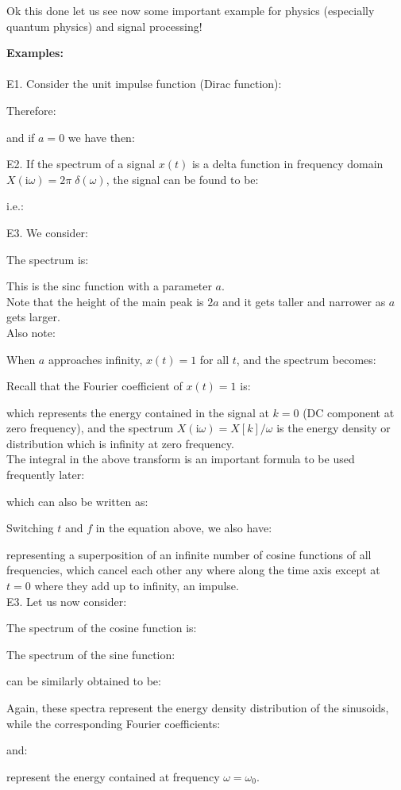 	Ok this done let us see now some important example for physics (especially quantum physics) and signal processing!
	\begin{tcolorbox}[colframe=black,colback=white,sharp corners,breakable]
	\textbf{{\Large {}}Examples:}\\\\
	E1. Consider the unit impulse function (Dirac function):
	
	Therefore:
	
	and if $a=0$ we have then:
	
	E2. If the spectrum of a signal $x(t)$ is a delta function in frequency domain $X(\mathrm{i}\omega)=2\pi\;\delta(\omega)$, the signal can be found to be:
	
	i.e.:
	
	E3. We consider:
	
	The spectrum is:
	
	This is the sinc function with a parameter $a$.\\
	
	Note that the height of the main peak is $2a$ and it gets taller and narrower as	$a$ gets larger.\\
	
	 Also note:
	
	When $a$ approaches infinity, $x(t)=1$ for all $t$, and the spectrum becomes:
	
	Recall that the Fourier coefficient of $x(t)=1$ is:
	
	which represents the energy contained in the signal at $k=0$ (DC component at zero frequency), and the spectrum $X(\mathrm{i}\omega)=X[k]/\omega$ is the energy density or distribution which is infinity at zero frequency.\\
	
	The integral in the above transform is an important formula to be used frequently later:
	
	which can also be written as:
	
	Switching $t$ and $f$ in the equation above, we also have:
	
	representing a superposition of an infinite number of cosine functions of all
	frequencies, which cancel each other any where along the time axis except at
	$t=0$ where they add up to infinity, an impulse. \\
	
	E3. Let us now consider:
	
	The spectrum of the cosine function is:
	
	The spectrum of the sine function:
	
	can be similarly obtained to be:
	
	Again, these spectra represent the energy density distribution of the sinusoids, while the corresponding Fourier coefficients:
	
	and:
	
	represent the energy contained at frequency $\omega=\omega_0$.
	\end{tcolorbox}
	
